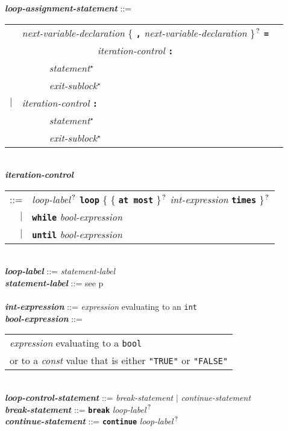 \documentclass[12pt]{article}
\newcommand{\TT}[1]{{\tt \bfseries #1}}
\newcommand{\STAR}{{\Large $^\star$}}
\newcommand{\QMARK}{{$^{\,\mbox{\footnotesize ?}}$}}
\newcommand{\ttkey}[1]{{\tt \bfseries #1}}
\newcommand{\emkey}[1]{{\em \bfseries #1}}
\newcommand{\pagref}[1]{p\pageref{#1}}
\newenvironment{indpar}[1][0.3in]%
	{\begin{list}{}%
		     {\setlength{\itemsep}{0in}%
		      \setlength{\topsep}{0in}%
		      \setlength{\parsep}{1ex}%
		      \setlength{\labelwidth}{#1}%
		      \setlength{\leftmargin}{#1}%
		      \addtolength{\leftmargin}{\labelsep}}%
	 \item}%
	{\end{list}}
\begin{document}
\begin{indpar}
\emkey{loop-assignment-statement} ::= \\
\hspace*{0.5in}
    \begin{tabular}[t]{@{}rll}
        & {\em next-variable-declaration}
                \{ \TT{,} {\em next-variable-declaration} \}\QMARK{}
		\TT{=} \\
	& ~~~~~~~~~~~~~~~ {\em iteration-control} \TT{:} \\
        & ~~~~~ {\em statement}\STAR{} \\
        & ~~~~~ {\em exit-sublock}\STAR{} \\
    $|$ & {\em iteration-control} \TT{:} \\
        & ~~~~~ {\em statement}\STAR{} \\
        & ~~~~~ {\em exit-sublock}\STAR{} \\
    \end{tabular}
\\[0.5ex]
\emkey{iteration-control}\label{ITERATION-CONTROL}
    \begin{tabular}[t]{rl}
     ::= & {\em loop-label}\QMARK{} \ttkey{loop}
	   \{ \{ \ttkey{at most} \}\QMARK{}
	   {\em int-expression} \ttkey{times} \}\QMARK{} \\
     $|$ & \ttkey{while} {\em bool-expression} \\
     $|$ & \ttkey{until} {\em bool-expression} \\
     \end{tabular}
\\[0.5ex]
\emkey{loop-label} ::= {\em statement-label}
\\[0.5ex]
\emkey{statement-label} ::= see \pagref{STATEMENT-LABEL} \\
\\[0.5ex]
\emkey{int-expression} ::= {\em expression} evaluating to an {\tt int}
\\[0.5ex]
\emkey{bool-expression}\label{BOOL-EXPRESSION} ::=
    \begin{tabular}[t]{@{}l}
    {\em expression} evaluating to a {\tt bool} \\
    or to a {\em const} value that is either {\tt "TRUE"} or {\tt "FALSE"}
    \end{tabular}
\\[0.5ex]
\emkey{loop-control-statement}\label{LOOP-CONTROL-STATEMENT} ::=
    {\em break-statement} $|$ {\em continue-statement}
\\[0.5ex]
\emkey{break-statement}\label{BREAK-STATEMENT} ::=
    \ttkey{break} {\em loop-label}\QMARK{}
\\[0.5ex]
\emkey{continue-statement}\label{CONTINUE-STATEMENT} ::=
    \ttkey{continue} {\em loop-label}\QMARK{}
\end{indpar}
\end{document}
